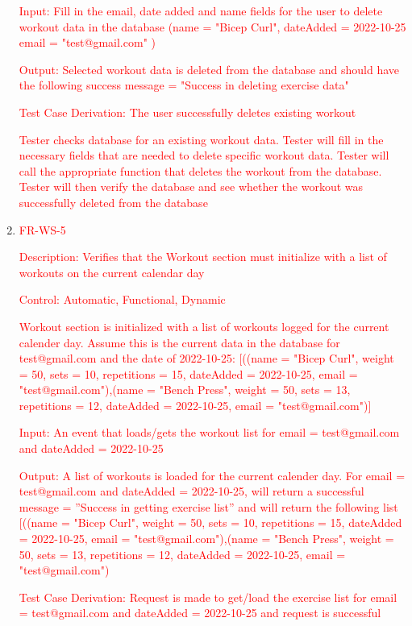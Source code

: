\documentclass[12pt, titlepage]{article}
\begin{document}
\begin{enumerate}
	\textcolor{red}{Input: Fill in the email, date added and name fields for the user to delete workout data in the database (name = "Bicep Curl", dateAdded = 2022-10-25 email = "test@gmail.com" )}
	
	\textcolor{red}{Output: Selected workout data is deleted from the database and should have the following success message = "Success in deleting exercise data"}
	
	\textcolor{red}{Test Case Derivation: The user successfully deletes existing workout}
	
	\textcolor{red}{Tester checks database for an existing workout data. Tester will fill in the necessary fields that are needed to delete specific workout data. Tester will call the appropriate function that deletes the workout from the database. Tester will then verify the database and see whether the workout was successfully deleted from the database}

   \item{\textcolor{red}{FR-WS-5\\}}

 \textcolor{red}{Description: Verifies that the Workout section must initialize with a list of workouts on the current calendar day}
	
	\textcolor{red}{Control: Automatic, Functional, Dynamic}
	
	\textcolor{red}{Workout section is initialized with a list of workouts logged for the current calender day. Assume this is the current data in the database for test@gmail.com and the date of 2022-10-25: [((name = "Bicep Curl", weight = 50, sets = 10, repetitions = 15, dateAdded = 2022-10-25, email = "test@gmail.com"),(name = "Bench Press", weight = 50, sets = 13, repetitions = 12, dateAdded = 2022-10-25, email = "test@gmail.com")]}
	
	\textcolor{red}{Input: An event that loads/gets the workout list for email = test@gmail.com and dateAdded = 2022-10-25}
	
	\textcolor{red}{Output: A list of workouts is loaded for the current calender day. For email = test@gmail.com and dateAdded = 2022-10-25, will return a successful message = ”Success in getting exercise list” and will return the following list [((name = "Bicep Curl", weight = 50, sets = 10, repetitions = 15, dateAdded = 2022-10-25, email = "test@gmail.com"),(name = "Bench Press", weight = 50, sets = 13, repetitions = 12, dateAdded = 2022-10-25, email = "test@gmail.com")}
	
	\textcolor{red}{Test Case Derivation: Request is made to get/load the exercise list for email = test@gmail.com and dateAdded = 2022-10-25 and request is successful}
	

\end{enumerate}
\end{document}
